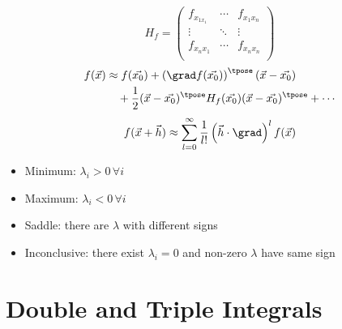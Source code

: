 \documentclass[10pt, a4paper]{article}
\begin{document}
\begin{landscape}
\begin{multicols}{3}
    \[H_{f} = \begin{pmatrix}
        f_{x_{1 x_{1}}} & \cdots & f_{x_{1} x_{n}} \\ 
        \vdots & \ddots & \vdots \\ 
        f_{x_{n} x_{1}} & \cdots & f_{x_{n} x_{n}} \\ 
    \end{pmatrix}\]
    \begin{align*}
        f(\vec{x}) &\approx f(\vec{x_0}) + \left(\grad f (\vec{x_0})\right)^{\tpose} (\vec{x} - \vec{x_0}) \\
        &\quad + \frac{1}{2} (\vec{x} - \vec{x_0})^{\tpose} H_{f}(\vec{x_0}) (\vec{x} - \vec{x_0})^{\tpose} + \cdots
    \end{align*}
    \[
        f(\vec{x} + \vec{h}) \approx \sum_{l=0}^{\infty} \frac{1}{l!} \left(\vec{h} \cdot \grad\right)^{l} f(\vec{x})
    \]
    \begin{itemize}
        \item Minimum: \(\lambda_{i} > 0 \,\forall i\)
        \item Maximum: \(\lambda_{i} < 0 \,\forall i\)
        \item Saddle: there are \(\lambda\) with different signs
        \item Inconclusive: there exist \(\lambda_{i} = 0\) and non-zero \(\lambda\) have same sign
    \end{itemize}

    \section{Double and Triple Integrals}


\end{multicols}
\end{landscape}
\end{document}
